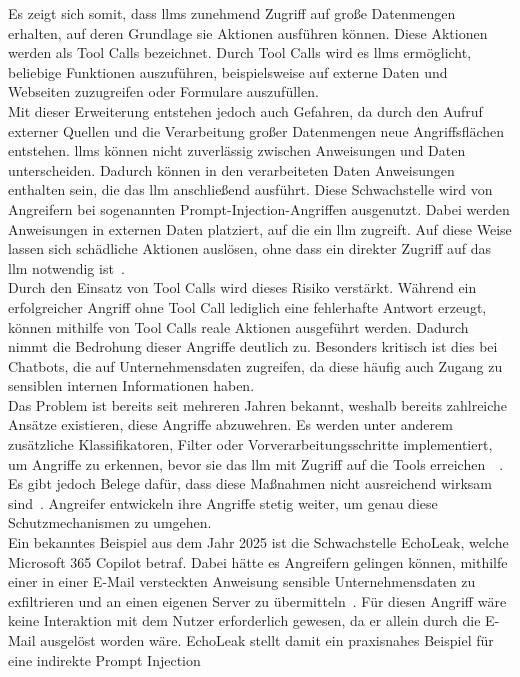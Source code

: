 Es zeigt sich somit, dass \acp{llm} zunehmend Zugriff auf große Datenmengen erhalten, auf deren Grundlage sie Aktionen ausführen können. Diese Aktionen werden als
\glqq Tool Calls\grqq{} bezeichnet. Durch Tool Calls wird es \acp{llm} ermöglicht, beliebige Funktionen auszuführen, beispielsweise auf externe Daten und Webseiten zuzugreifen 
oder Formulare auszufüllen. \\
Mit dieser Erweiterung entstehen jedoch auch Gefahren, da durch den Aufruf 
externer Quellen und die Verarbeitung großer Datenmengen neue Angriffsflächen entstehen. \acp{llm} können nicht zuverlässig zwischen Anweisungen 
und Daten unterscheiden. Dadurch können in den verarbeiteten Daten Anweisungen enthalten sein, die das \ac{llm} anschließend ausführt. Diese Schwachstelle
wird von Angreifern bei sogenannten \glqq Prompt-Injection-Angriffen\grqq{} ausgenutzt. Dabei werden Anweisungen in externen Daten platziert, auf die ein \ac{llm} zugreift.
Auf diese Weise lassen sich schädliche Aktionen auslösen, ohne dass ein direkter Zugriff auf das \ac{llm} notwendig ist~\cite{pi15}. \\
Durch den Einsatz von Tool Calls wird dieses Risiko verstärkt. Während ein erfolgreicher Angriff ohne Tool Call lediglich eine fehlerhafte Antwort erzeugt, können
mithilfe von Tool Calls reale Aktionen ausgeführt werden. Dadurch nimmt die Bedrohung dieser Angriffe deutlich zu. Besonders kritisch ist dies bei Chatbots, die 
auf Unternehmensdaten zugreifen, da diese häufig auch Zugang zu sensiblen internen Informationen haben. \\
Das Problem ist bereits seit mehreren Jahren bekannt, weshalb bereits zahlreiche Ansätze existieren, diese Angriffe abzuwehren. Es werden unter anderem zusätzliche
Klassifikatoren, Filter oder Vorverarbeitungsschritte implementiert, um Angriffe zu erkennen, bevor sie das \ac{llm} mit Zugriff auf die Tools erreichen~\cite[4]{pi9}~\cite[9]{sm10}.
Es gibt jedoch Belege dafür, dass diese Maßnahmen nicht ausreichend wirksam sind~\cite{sm22}. Angreifer entwickeln ihre Angriffe stetig weiter, um genau diese 
Schutzmechanismen zu umgehen. \\
Ein bekanntes Beispiel aus dem Jahr 2025 ist die Schwachstelle \glqq EchoLeak\grqq, welche Microsoft 365 Copilot betraf. Dabei hätte es Angreifern gelingen können, 
mithilfe einer in einer E-Mail
versteckten Anweisung sensible Unternehmensdaten zu exfiltrieren und an einen eigenen Server zu übermitteln~\cite{e07}. Für diesen Angriff wäre keine Interaktion mit dem
Nutzer erforderlich gewesen, da er allein durch die E-Mail ausgelöst worden wäre. EchoLeak stellt damit ein praxisnahes Beispiel für eine indirekte Prompt Injection
